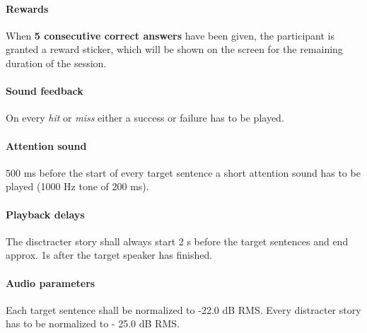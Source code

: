 \documentclass[a4paper,11pt]{article}%
\renewcommand{\\}{\vspace*{0.5\baselineskip} \newline}
\begin{document}
\paragraph{Rewards} When \textbf{5 consecutive correct answers} have been given, the participant is granted a reward sticker, which will be shown on the screen for the remaining duration of the session.

\paragraph{Sound feedback} On every \textit{hit} or \textit{miss} either a \dq success\dq{} or \dq failure\dq{} has to be played.

\paragraph{Attention sound} 500 ms before the start of every target sentence a short attention sound has to be played (1000 Hz tone of 200 ms).

\paragraph{Playback delays} The disctracter story shall always start 2 s before the target sentences and end approx. 1s after the target speaker has finished.

\paragraph{Audio parameters} Each target sentence shall be normalized to -22.0 dB \acs{RMS}. Every distracter story has to be normalized to - 25.0 dB \acs{RMS}.


\end{document}
